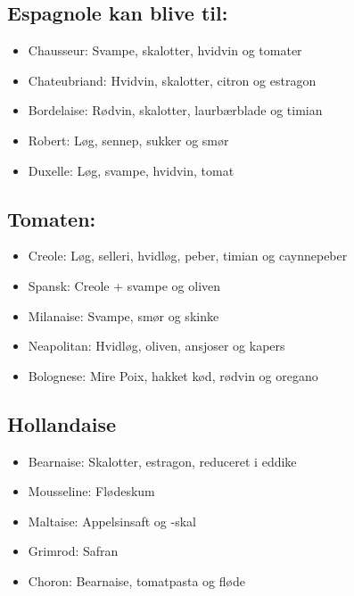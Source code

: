 \documentclass[
  letterpaper,
  DIV=11,
  numbers=noendperiod]{scrreprt}
\providecommand{\tightlist}{%
  \setlength{\itemsep}{0pt}\setlength{\parskip}{0pt}}\usepackage{longtable,booktabs,array}
\begin{document}
\hypertarget{espagnole-kan-blive-til}{%
\subsection{Espagnole kan blive til:}\label{espagnole-kan-blive-til}}

\begin{itemize}
\tightlist
\item
  Chausseur: Svampe, skalotter, hvidvin og tomater
\item
  Chateubriand: Hvidvin, skalotter, citron og estragon
\item
  Bordelaise: Rødvin, skalotter, laurbærblade og timian
\item
  Robert: Løg, sennep, sukker og smør
\item
  Duxelle: Løg, svampe, hvidvin, tomat
\end{itemize}

\hypertarget{tomaten}{%
\subsection{Tomaten:}\label{tomaten}}

\begin{itemize}
\tightlist
\item
  Creole: Løg, selleri, hvidløg, peber, timian og caynnepeber
\item
  Spansk: Creole + svampe og oliven
\item
  Milanaise: Svampe, smør og skinke
\item
  Neapolitan: Hvidløg, oliven, ansjoser og kapers
\item
  Bolognese: Mire Poix, hakket kød, rødvin og oregano
\end{itemize}

\hypertarget{hollandaise}{%
\subsection{Hollandaise}\label{hollandaise}}

\begin{itemize}
\tightlist
\item
  Bearnaise: Skalotter, estragon, reduceret i eddike
\item
  Mousseline: Flødeskum
\item
  Maltaise: Appelsinsaft og -skal
\item
  Grimrod: Safran
\item
  Choron: Bearnaise, tomatpasta og fløde
\end{itemize}
\end{document}
